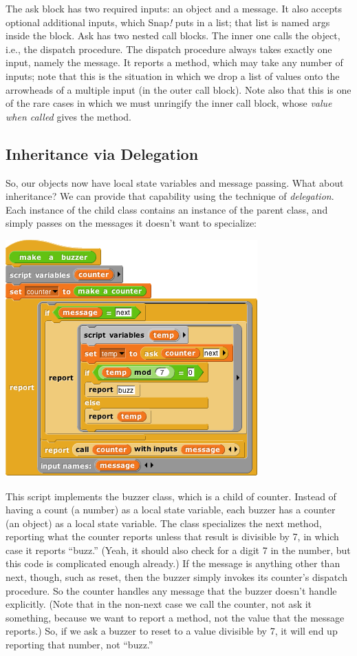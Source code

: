 The ask block has two required inputs: an object and a message. It also
accepts optional additional inputs, which Snap\emph{!} puts in a list;
that list is named args inside the block. Ask has two nested call
blocks. The inner one calls the object, i.e., the dispatch procedure.
The dispatch procedure always takes exactly one input, namely the
message. It reports a method, which may take any number of inputs; note
that this is the situation in which we drop a list of values onto the
arrowheads of a multiple input (in the outer call block). Note also that
this is one of the rare cases in which we must unringify the inner call
block, whose \emph{value when called} gives the method.

\subsection{Inheritance via
Delegation}\label{inheritance-via-delegation}

So, our objects now have local state variables and message passing. What
about inheritance? We can provide that capability using the technique of
\emph{delegation}. Each instance of the child class contains an instance
of the parent class, and simply passes on the messages it doesn't want
to specialize:

\includegraphics[width=3.8125in,height=3.58333in]{media/image857.png}

This script implements the buzzer class, which is a child of counter.
Instead of having a count (a number) as a local state variable, each
buzzer has a counter (an object) as a local state variable. The class
specializes the next method, reporting what the counter reports unless
that result is divisible by 7, in which case it reports ``buzz.'' (Yeah,
it should also check for a digit 7 in the number, but this code is
complicated enough already.) If the message is anything other than next,
though, such as reset, then the buzzer simply invokes its counter's
dispatch procedure. So the counter handles any message that the buzzer
doesn't handle explicitly. (Note that in the non-next case we call the
counter, not ask it something, because we want to report a method, not
the value that the message reports.) So, if we ask a buzzer to reset to
a value divisible by 7, it will end up reporting that number, not
``buzz.''

